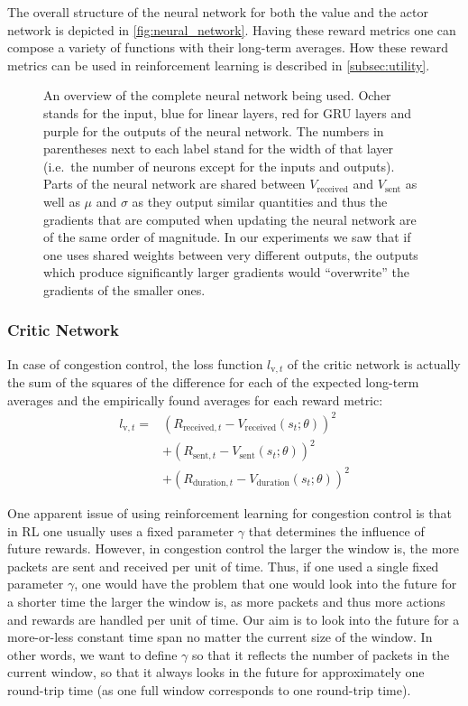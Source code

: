 \documentclass[newfonts=false,format=sigconf,10pt,letterpaper]{acmart}
\begin{document}
The overall structure of the neural network for both the value and the actor network is depicted in \autoref{fig:neural_network}. Having these reward metrics one can compose a variety of functions with their long-term averages. How these reward metrics can be used in reinforcement learning is described in \autoref{subsec:utility}. 

\begin{figure}



\caption{An overview of the complete neural network being used. Ocher stands for the input, blue for linear layers, red for GRU layers and purple for the outputs of the neural network. The numbers in parentheses next to each label stand for the width of that layer (i.e.~the number of neurons except for the inputs and outputs). Parts of the neural network are shared between $V_\text{received}$ and $V_\text{sent}$ as well as $\mu$ and $\sigma$ as they output similar quantities and thus the gradients that are computed when updating the neural network are of the same order of magnitude. In our experiments we saw that if one uses shared weights between very different outputs, the outputs which produce significantly larger gradients would ``overwrite'' the gradients of the smaller ones.}
\label{fig:neural_network}
\end{figure}

\subsubsection{Critic Network}
\label{subsubsec:critic}

In case of congestion control, the loss function $l_{\text{v},t}$ of the critic network is actually the sum of the squares of the difference for each of the expected long-term averages and the empirically found averages for each reward metric:
\begin{align}
l_{\text{v},t} =& \left(R_{\text{received},t} - V_\text{received}(s_t; \theta)\right)^2 \\
&+\left(R_{\text{sent},t} - V_\text{sent}(s_t; \theta)\right)^2 \\
&+\left(R_{\text{duration},t} - V_\text{duration}(s_t; \theta)\right)^2
\end{align}

One apparent issue of using reinforcement learning for congestion control is that in RL one usually uses a fixed parameter $\gamma$ that determines the influence of future rewards. However, in congestion control the larger the window is, the more packets are sent and received per unit of time. Thus, if one used a single fixed parameter $\gamma$, one would have the problem that one would look into the future for a shorter time the larger the window is, as more packets and thus more actions and rewards are handled per unit of time. Our aim is to look into the future for a more-or-less constant time span no matter the current size of the window. In other words, we want to define $\gamma$ so that it reflects the number of packets in the current window, so that it always looks in the future for approximately one round-trip time (as one full window corresponds to one round-trip time). 
\end{document}
